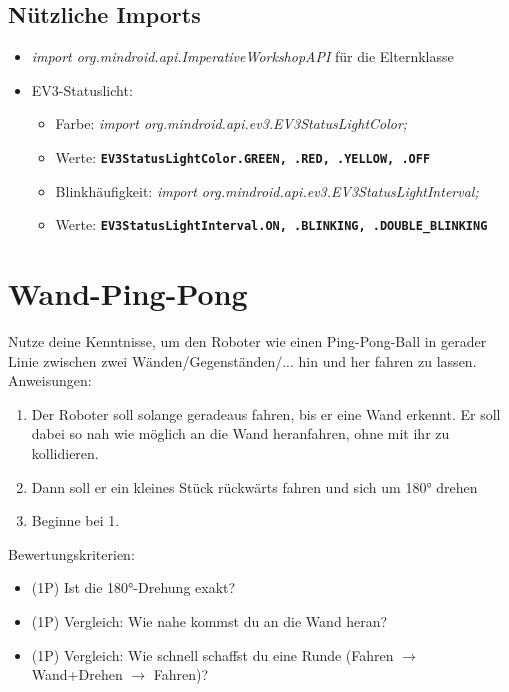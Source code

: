 \documentclass[
	12pt,
	colorbacktitle,
	accentcolor=tud1c,
	draft,
	twoside,
	german
]{tudexercise}
\newcommand{\bfcode}[1]{\texttt{\textbf{#1}}}
\begin{document}
	\subsection{Nützliche Imports}
	\begin{itemize}
	\item \emph{import org.mindroid.api.ImperativeWorkshopAPI} für die Elternklasse
	\item EV3-Statuslicht:
	\begin{itemize}
	\item Farbe: \emph{import org.mindroid.api.ev3.EV3StatusLightColor;}
	\item Werte: \bfcode{EV3StatusLightColor.GREEN, .RED, .YELLOW, .OFF}
	\item Blinkhäufigkeit: \emph{import org.mindroid.api.ev3.EV3StatusLightInterval; }
	\item Werte: \bfcode{EV3StatusLightInterval.ON, .BLINKING, .DOUBLE\_BLINKING}
	\end{itemize}
	\end{itemize}
	
	\newpage
	\section{Wand-Ping-Pong}
	Nutze deine Kenntnisse, um den Roboter wie einen Ping-Pong-Ball in gerader Linie zwischen zwei Wänden/Gegenständen/... hin und her fahren zu lassen.
	Anweisungen:
	\begin{enumerate}
	\item Der Roboter soll solange geradeaus fahren, bis er eine Wand erkennt. Er soll dabei so nah wie möglich an die Wand heranfahren, ohne mit ihr zu kollidieren.
	\item Dann soll er ein kleines Stück rückwärts fahren und sich um 180° drehen
	\item Beginne bei 1.
	\end{enumerate}
	
	Bewertungskriterien:
	\begin{itemize}
	\item (1P) Ist die 180°-Drehung exakt?
	\item (1P) Vergleich: Wie nahe kommst du an die Wand heran?
	\item (1P) Vergleich: Wie schnell schaffst du eine Runde (Fahren $\rightarrow$ Wand+Drehen $\rightarrow$ Fahren)?
	\end{itemize}
	
\end{document}
